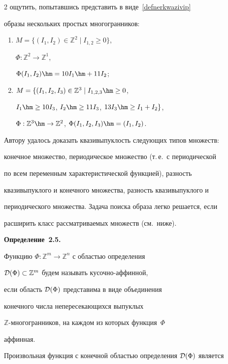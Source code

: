 \begin{multicols}{2}
ощутить, попытавшись представить в виде~\eqref{defnerkwazivip}

образы нескольких простых многогранников:

\begin{enumerate}[1)]

  \item $M=\{(I_1,I_2)\in\mathbb{Z}^2 \mid I_{1,2}\geq0\}$, 

  $\Phi:\mathbb{Z}^2\to\mathbb{Z}^1$, 

  $\Phi(I_1,I_2)\hm=10I_1\hm+11I_2$;

  \item $M=\{(I_1,I_2,I_3)\in\mathbb{Z}^3 \mid I_{1,2,3}\hm\geq0$, 

  $I_1\hm\geq10I_3$, $I_2\hm\geq11I_3$,  $13I_3\hm\geq I_1+I_2 \}$, 

  $\Phi:\mathbb{Z}^3\hm\to\mathbb{Z}^2$, $\Phi(I_1,I_2,I_3)\hm=(I_1,I_2)$.

\end{enumerate}

Автору удалось доказать квазивыпуклость следующих типов множеств:

конечное множество, периодическое множество (т.\,е.\ с периодической

по всем переменным характеристической функцией), разность

квазивыпуклого и конечного множества, разность квазивыпуклого и

периодического множества. Задача поиска образа легко решается, если

расширить класс рассматриваемых множеств (см.\ ниже).



\smallskip



\noindent

\textbf{Определение~2.5.}

Функцию $\Phi:\mathbb{Z}^m\to\mathbb{Z}^n$ с областью определения

${\cal D}(\Phi)\subset\mathbb{Z}^m$ будем называть ку\-соч\-но-аф\-фин\-ной,

если область ${\cal D}(\Phi)$ представима в виде объединения

конечного числа непересекающихся выпуклых

$\mathbb{Z}$-мно\-го\-гран\-ников, на каждом из которых функция~$\Phi$

аффинная.





Произвольная функция с конечной областью определения ${\cal D}(\Phi)$ является 


\end{multicols}
